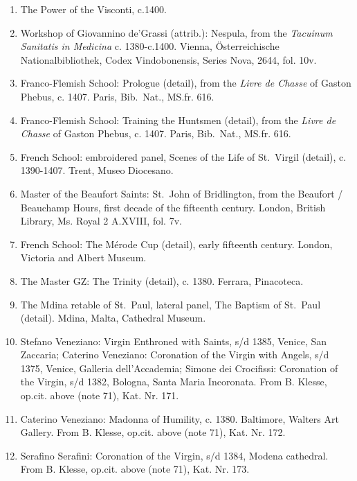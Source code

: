 \documentclass[a4paper,12pt]{article}
\begin{document}
\begin{enumerate}
\item %
The Power of the Visconti, c.1400.

\item %
Workshop of Giovannino de'Grassi (attrib.): Nespula, from the
\textit{Tacuinum Sanitatis in Medicina} c. 1380-c.1400.
Vienna, \"Osterreichische Nationalbibliothek, Codex Vindobonensis,
Series Nova, 2644, fol. 10v.

\item %
Franco-Flemish School: Prologue (detail), from the \textit{Livre de
Chasse} of Gaston Phebus, c. 1407.  Paris, Bib.~Nat., MS.fr. 616.

\item %
Franco-Flemish School: Training the Huntsmen (detail), from the
\textit{Livre de Chasse} of Gaston Phebus, c. 1407.  Paris,
Bib.~Nat., MS.fr. 616.

\item %
French School: embroidered panel, Scenes of the Life of St.~Virgil
(detail), c. 1390-1407.  Trent, Museo Diocesano.

\item %
Master of the Beaufort Saints: St.~John of Bridlington, from the
Beaufort / Beauchamp Hours, first decade of the fifteenth century.
London, British Library, Ms. Royal 2 A.XVIII, fol. 7v.

\item %
French School: The M\'erode Cup (detail), early fifteenth century.
London, Victoria and Albert Museum.

\item %
The Master GZ: The Trinity (detail), c. 1380.  Ferrara, Pinacoteca.

\item %
The Mdina retable of St.~Paul, lateral panel, The Baptism of St.~Paul
(detail).  Mdina, Malta, Cathedral Museum.

\item %
Stefano Veneziano: Virgin Enthroned with Saints, s/d 1385, Venice, San
Zaccaria; Caterino Veneziano: Coronation of the Virgin with Angels,
s/d 1375, Venice, Galleria dell'Accademia; Simone dei Crocifissi:
Coronation of the Virgin, s/d 1382, Bologna, Santa Maria Incoronata.
From B. Klesse, op.cit. above (note 71), Kat. Nr. 171.

\item %
Caterino Veneziano: Madonna of Humility, c. 1380.  Baltimore, Walters
Art Gallery.  From B. Klesse, op.cit. above (note 71), Kat. Nr. 172.

\item %
Serafino Serafini: Coronation of the Virgin, s/d 1384, Modena
cathedral.  From B. Klesse, op.cit. above (note 71), Kat. Nr. 173.


\end{enumerate}
\end{document}
